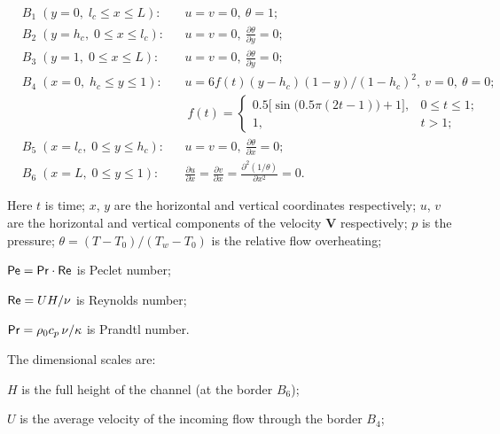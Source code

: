 \begin{align*}

 & B_1\;(y=0, \; l_c\leqslant x \leqslant L)\!: &&u = v = 0, \ \theta=1; \\

 & B_2\;(y=h_c, \; 0\leqslant x \leqslant l_c)\!: &&u = v = 0, \ \frac{\partial \theta}{\partial y}=0; \\

 & B_3\;(y=1, \; 0\leqslant x \leqslant L)\!: &&u = v = 0, \ \frac{\partial \theta}{\partial y}=0; \\

 & B_4\;(x=0, \; h_c\leqslant y \leqslant 1)\!: &&u = 6f(t)(y-h_c)(1-y)/(1-h_c)^2, \ v = 0, \ \theta=0; \\

                         &&& \ f(t) =\begin{cases} 0.5\bigl[\sin\bigl(0.5\pi\left( 2t-1 \right) \bigr) +1\bigr]\!, & 0 \leqslant t \leqslant 1; \\

                            1, & t>1;

					               \end{cases} \\

 & B_5\;(x=l_c, \; 0\leqslant y \leqslant h_c)\!: &&u = v = 0, \ \frac{\partial \theta}{\partial x}=0; \\

 & B_6\;(x=L, \; 0\leqslant y \leqslant 1)\!: &&\frac{\partial u}{\partial x} = \frac{\partial v}{\partial x} =\frac{\partial^2 (1/\theta)}{\partial x^2} = 0.

\end{align*}

%

\noindent Here $t$ is time; $x$, $y$ are the horizontal and vertical coordinates respectively; $u$, $v$ are the horizontal and vertical components of the velocity \textbf{V} respectively; $p$ is the pressure; $\theta=(T-T_0)/(T_w-T_0)$ is the relative flow overheating; 

${\sf Pe} = {\sf Pr}\cdot{\sf Re}$ is Peclet number; 

${\sf Re} = U H/\nu$ is Reynolds number; 

${\sf Pr} = \rho_0c_p \,\nu/\kappa$ is Prandtl number. 

The dimensional scales are: 

$H$ is the full height of the channel (at the border $B_6$); 

$U$ is the average velocity of the incoming flow through the border $B_4$; 

